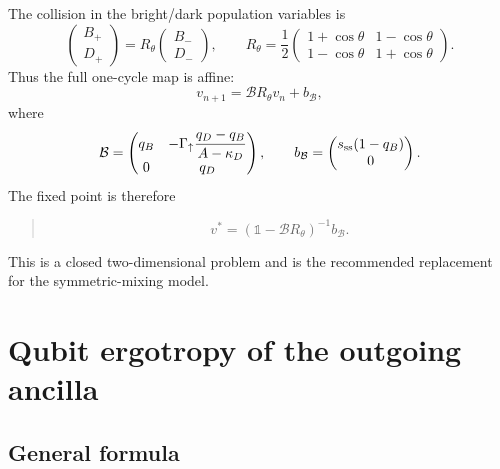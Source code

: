 \documentclass[11pt,a4paper]{article}
\newcommand{\id}{\mathbb{1}}
\newenvironment{resultbox}{\begin{quote}\small}{\end{quote}}
\begin{document}
The collision in the bright/dark population variables is
\begin{equation}
\begin{pmatrix}B_+\\D_+\end{pmatrix}
=R_\theta
\begin{pmatrix}B_-\\D_-\end{pmatrix},
\qquad
R_\theta=\frac12\begin{pmatrix}1+\cos\theta&1-\cos\theta\\1-\cos\theta&1+\cos\theta\end{pmatrix}.
\end{equation}
Thus the full one-cycle map is affine:
\begin{equation}
v_{n+1}=\mathcal B R_\theta v_n+b_{\mathcal B},
\end{equation}
where
\begin{equation}
\mathcal B=\begin{pmatrix}
q_B&-\Gamma_\uparrow\dfrac{q_D-q_B}{A-\kappa_D}\\
0&q_D
\end{pmatrix},
\qquad
b_{\mathcal B}=\begin{pmatrix}s_{\rm ss}(1-q_B)\\0\end{pmatrix}.
\end{equation}
The fixed point is therefore
\begin{resultbox}
\begin{equation}
v^*=\left(\id-\mathcal B R_\theta\right)^{-1}b_{\mathcal B}.
\end{equation}
\end{resultbox}
This is a closed two-dimensional problem and is the recommended replacement for the symmetric-mixing model.

\section{Qubit ergotropy of the outgoing ancilla}

\subsection{General formula}
\end{document}
